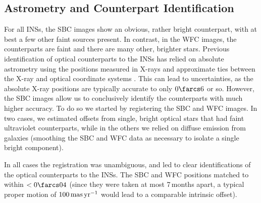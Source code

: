 \documentclass[iop]{emulateapj}
\begin{document}
\subsection{Astrometry and Counterpart Identification}
For all INSs, the SBC images show an obvious, rather bright
counterpart, with at best a few other faint sources present.  In
contrast, in the WFC images, the counterparts are faint and there are
many other, brighter stars.  Previous identification of optical
counterparts to the INSs has relied on absolute astrometry using the
positions measured in X-rays and approximate ties between the X-ray
and optical coordinate systems \citep[e.g.,][]{kkvk03}.  This can lead
to uncertainties, as the absolute X-ray positions are typically
accurate to only $0\farcs6$ or so.  However, the SBC images allow us
to conclusively identify the counterparts with much higher
accuracy. To do so we started by registering the SBC and WFC images.
In two cases, we estimated offsets from single, bright optical stars
that had faint ultraviolet counterparts, while in the others we relied
on diffuse emission from galaxies (smoothing the SBC and WFC data as
necessary to isolate a single bright component).

In all cases the registration was unambiguous, and led to clear
identifications of the optical counterparts to the INSs.  The SBC and
WFC positions matched to within $<0\farcs04$ (since they were taken at
most 7\,months apart, a typical proper motion of $100\,{\rm
 mas\,yr}^{-1}$ would lead to a comparable intrinsic offset).
\end{document}
